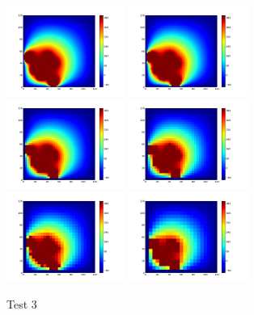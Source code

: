 \documentclass[a4paper]{article}
\begin{document}
\begin{figure}[htbp]
\includegraphics[width=110pt]{img/Parabrisas3-1.png} \includegraphics[width=110pt]{img/Parabrisas3-2.png} \includegraphics[width=110pt]{img/Parabrisas3-3.png} \newline \includegraphics[width=110pt]{img/Parabrisas3-4.png} \includegraphics[width=110pt]{img/Parabrisas3-5.png} \includegraphics[width=110pt]{img/Parabrisas3-6.png} \newline
\caption{Test 3}
\end{figure}
\end{document}
